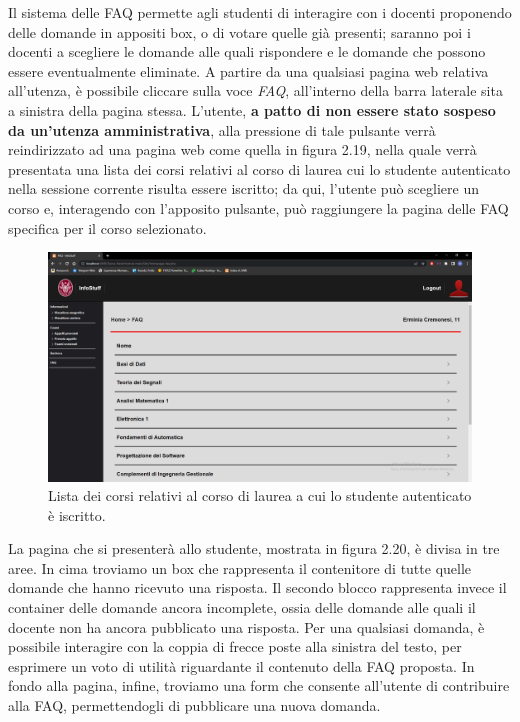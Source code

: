 \documentclass [a4paper,11pt]{book}
\begin{document}
Il sistema delle FAQ permette agli studenti di interagire con i docenti proponendo delle domande in appositi box, o di votare quelle già presenti; saranno poi i docenti a scegliere le domande alle quali rispondere e le domande che possono essere eventualmente eliminate. A partire da una qualsiasi pagina web relativa all'utenza, è possibile cliccare sulla voce \emph{FAQ}, all'interno della barra laterale sita a sinistra della pagina stessa. L'utente, \textbf{a patto di non essere stato sospeso da un'utenza amministrativa}, alla pressione di tale pulsante verrà reindirizzato ad una pagina web come quella in figura 2.19, nella quale verrà presentata una lista dei corsi relativi al corso di laurea cui lo studente autenticato nella sessione corrente risulta essere iscritto; da qui, l'utente può scegliere un corso e, interagendo con l'apposito pulsante, può raggiungere la pagina delle FAQ specifica per il corso selezionato.

\begin{figure}
\centering
\includegraphics[scale=0.3]{figura2-19.png}
\caption{Lista dei corsi relativi al corso di laurea a cui lo studente autenticato è iscritto.}
\end{figure}

La pagina che si presenterà allo studente, mostrata in figura 2.20, è divisa in tre aree. In cima troviamo un box che rappresenta il contenitore di tutte quelle domande che hanno ricevuto una risposta. Il secondo blocco rappresenta invece il container delle domande ancora incomplete, ossia delle domande alle quali il docente non ha ancora pubblicato una risposta. Per una qualsiasi domanda, è possibile interagire con la coppia di frecce poste alla sinistra del testo, per esprimere un voto di utilità riguardante il contenuto della FAQ proposta. In fondo alla pagina, infine, troviamo una form che consente all'utente di contribuire alla FAQ, permettendogli di pubblicare una nuova domanda. 
\end{document}
